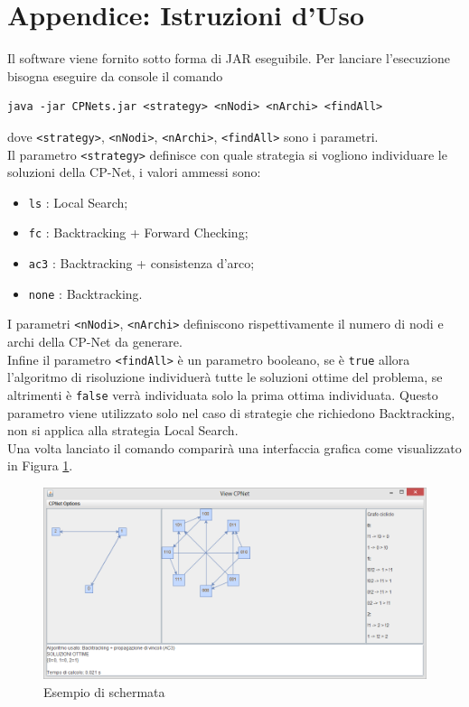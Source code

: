 \documentclass[a4paper,titlepage]{article}
\begin{document}
\section{Appendice: Istruzioni d'Uso}
Il software viene fornito sotto forma di JAR eseguibile. Per lanciare l'esecuzione bisogna eseguire da console il comando
\begin{verbatim}
java -jar CPNets.jar <strategy> <nNodi> <nArchi> <findAll>
\end{verbatim}
dove \texttt{<strategy>}, \texttt{<nNodi>}, \texttt{<nArchi>}, \texttt{<findAll>} sono i parametri.\\
Il parametro \texttt{<strategy>} definisce con quale strategia si vogliono individuare le soluzioni della CP-Net, i valori ammessi sono:
\begin{itemize}
\item  \texttt{ls} : Local Search;
\item  \texttt{fc} : Backtracking + Forward Checking;
\item  \texttt{ac3} : Backtracking + consistenza d'arco;
\item  \texttt{none} : Backtracking.
\end{itemize}
I parametri \texttt{<nNodi>}, \texttt{<nArchi>} definiscono rispettivamente il numero di nodi e archi della CP-Net da generare.\\
Infine il parametro \texttt{<findAll>} è un parametro booleano, se è \texttt{true} allora l'algoritmo di risoluzione individuerà tutte le soluzioni ottime del problema, se altrimenti è \texttt{false} verrà individuata solo la prima ottima individuata. Questo parametro viene utilizzato solo nel caso di strategie che richiedono Backtracking, non si applica alla strategia Local Search.\\
Una volta lanciato il comando comparirà una interfaccia grafica come visualizzato in Figura \ref{fig:1}.\\
\begin{figure}
\centering
\includegraphics[scale=0.5]{../img/screen.png}
\caption{Esempio di schermata}\label{fig:1}
\end{figure}
\end{document}
